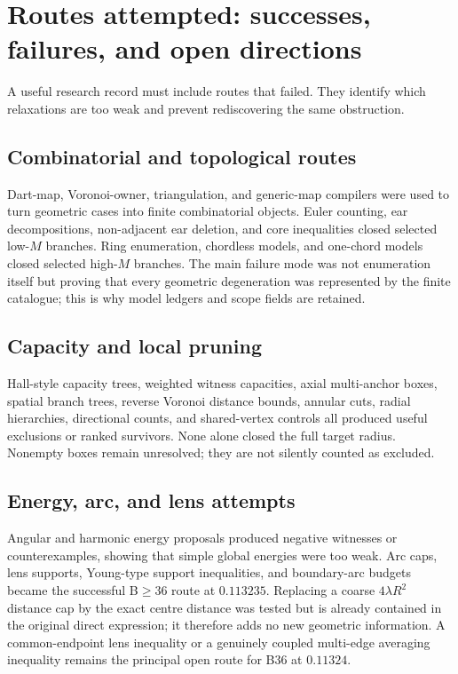 \section{Routes attempted: successes, failures, and open directions}
A useful research record must include routes that failed. They identify which relaxations are too weak and prevent rediscovering the same obstruction.

\subsection{Combinatorial and topological routes}
Dart-map, Voronoi-owner, triangulation, and generic-map compilers were used to turn geometric cases into finite combinatorial objects. Euler counting, ear decompositions, non-adjacent ear deletion, and core inequalities closed selected low-$M$ branches. Ring enumeration, chordless models, and one-chord models closed selected high-$M$ branches. The main failure mode was not enumeration itself but proving that every geometric degeneration was represented by the finite catalogue; this is why model ledgers and scope fields are retained.

\subsection{Capacity and local pruning}
Hall-style capacity trees, weighted witness capacities, axial multi-anchor boxes, spatial branch trees, reverse Voronoi distance bounds, annular cuts, radial hierarchies, directional counts, and shared-vertex controls all produced useful exclusions or ranked survivors. None alone closed the full target radius. Nonempty boxes remain unresolved; they are not silently counted as excluded.

\subsection{Energy, arc, and lens attempts}
Angular and harmonic energy proposals produced negative witnesses or counterexamples, showing that simple global energies were too weak. Arc caps, lens supports, Young-type support inequalities, and boundary-arc budgets became the successful B$\ge36$ route at $0.113235$. Replacing a coarse $4\lambda R^2$ distance cap by the exact centre distance was tested but is already contained in the original direct expression; it therefore adds no new geometric information. A common-endpoint lens inequality or a genuinely coupled multi-edge averaging inequality remains the principal open route for B36 at $0.11324$.

